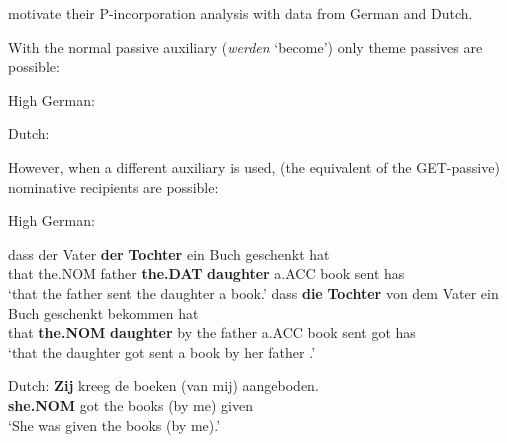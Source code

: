 \documentclass[11pt]{article}
\begin{document}
\cite{Alexiadou.2014} motivate their P-incorporation analysis with data from German and Dutch.

With the normal passive auxiliary (\textit{werden} `become') only theme passives are possible:
\begin{exe}
	\ex High German:\label{ex:hg-normal-pass}
\begin{xlist}
\end{xlist}
\ex Dutch:\label{ex:dutch-normal-pass}
\begin{xlist}
\end{xlist}
\end{exe}

However, when a different auxiliary is used, (the equivalent of the GET-passive) nominative recipients are possible:

\begin{exe}
	\ex High German:\label{ex:hg-get-pass}
\begin{xlist}
	\ex \gll dass der Vater \textbf{der} \textbf{Tochter} ein Buch geschenkt hat\\
	that the.NOM father \textbf{the.DAT} \textbf{daughter} a.ACC book sent has\\
	\trans `that the father sent the daughter a book.'
	\ex \gll dass \textbf{die} \textbf{Tochter} von dem Vater ein Buch geschenkt bekommen hat\\
	that \textbf{the.NOM} \textbf{daughter} by the father a.ACC book sent got has\\
	\trans `that the daughter got sent a book by her father \cite[183]{Draye.1996}.'
\end{xlist}
\ex Dutch:\label{ex:dut-get-pass}
\gll \textbf{Zij} kreeg de boeken (van mij) aangeboden.\\
\textbf{she.NOM} got the books (by me) given\\
\trans `She was given the books (by me).' \citep[ex. 7]{Broekhuis.1994}
\end{exe}
\end{document}
